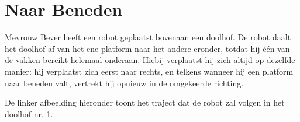 \documentclass[12pt]{article}
\begin{document}
	\begin{minipage}{\textwidth}
		\section{Naar Beneden}
			Mevrouw Bever heeft een robot geplaatst bovenaan een doolhof. De robot daalt het doolhof af van het ene platform naar het andere eronder, totdat hij één van de vakken bereikt helemaal onderaan. Hiebij verplaatst hij zich altijd op dezelfde manier: hij verplaatst zich eerst naar rechts, en telkens wanneer hij een platform naar beneden valt, vertrekt hij opnieuw in de omgekeerde richting.
			
			De linker afbeelding hieronder toont het traject dat de robot zal volgen in het doolhof nr. 1. \\
	

\end{minipage}
\end{document}
